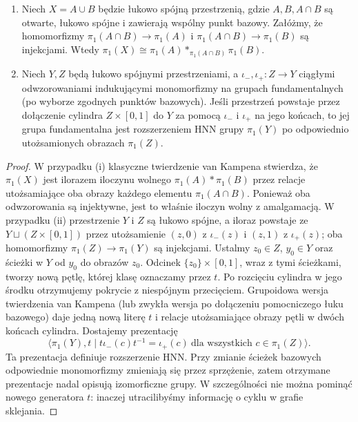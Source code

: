 \begin{twierdzenie}
\label{thm:tg-vk-amalgam-hnn}
\begin{enumerate}[label=(\roman*)]
\item Niech $X=A\cup B$ będzie łukowo spójną
przestrzenią, gdzie $A,B,A\cap B$ są otwarte,
łukowo spójne i zawierają wspólny punkt bazowy.
Załóżmy, że homomorfizmy
$\pi_1(A\cap B)\to\pi_1(A)$ i
$\pi_1(A\cap B)\to\pi_1(B)$ są injekcjami.
Wtedy
$\pi_1(X)\cong\pi_1(A)*_{\pi_1(A\cap B)}\pi_1(B)$.
\item Niech $Y,Z$ będą łukowo spójnymi przestrzeniami,
a $\iota_-,\iota_+\colon Z\to Y$ ciągłymi odwzorowaniami
indukującymi monomorfizmy na grupach fundamentalnych
(po wyborze zgodnych punktów bazowych). Jeśli przestrzeń
powstaje przez dołączenie cylindra $Z\times[0,1]$ do $Y$
za pomocą $\iota_-$ i $\iota_+$ na jego końcach,
to jej grupa fundamentalna jest
rozszerzeniem HNN grupy $\pi_1(Y)$ po odpowiednio
utożsamionych obrazach $\pi_1(Z)$.
\end{enumerate}
\end{twierdzenie}
\begin{proof}
W przypadku (i) klasyczne twierdzenie van Kampena stwierdza, że
$\pi_1(X)$ jest ilorazem iloczynu wolnego
$\pi_1(A)*\pi_1(B)$ przez relacje utożsamiające
oba obrazy każdego elementu $\pi_1(A\cap B)$.
Ponieważ oba odwzorowania są injektywne, jest to
właśnie iloczyn wolny z amalgamacją. W przypadku (ii) przestrzenie $Y$ i $Z$ są łukowo spójne,
a iloraz powstaje ze $Y\sqcup(Z\times[0,1])$ przez
utożsamienie $(z,0)$ z $\iota_-(z)$ i $(z,1)$ z
$\iota_+(z)$; oba homomorfizmy $\pi_1(Z)\to\pi_1(Y)$
są injekcjami. Ustalmy $z_0\in Z$, $y_0\in Y$
oraz ścieżki w $Y$ od $y_0$ do obrazów $z_0$.
Odcinek $\{z_0\}\times[0,1]$, wraz z tymi ścieżkami,
tworzy nową pętlę, której klasę oznaczamy przez $t$.
Po rozcięciu cylindra w jego środku otrzymujemy pokrycie
z niespójnym przecięciem. Grupoidowa wersja twierdzenia
van Kampena (lub zwykła wersja po dołączeniu pomocniczego
łuku bazowego) daje jedną nową literę $t$ i relacje
utożsamiające obrazy pętli w dwóch końcach cylindra.
Dostajemy prezentację
\[
\langle \pi_1(Y),t\mid t\iota_-(c)t^{-1}=\iota_+(c)
\ \text{dla wszystkich }c\in\pi_1(Z)\rangle.
\]
Ta prezentacja definiuje rozszerzenie HNN. Przy zmianie ścieżek bazowych odpowiednie monomorfizmy
zmieniają się przez sprzężenie, zatem otrzymane prezentacje
nadal opisują izomorficzne grupy. W szczególności nie można
pominąć nowego generatora $t$: inaczej utracilibyśmy
informację o cyklu w grafie sklejania.
\end{proof}

